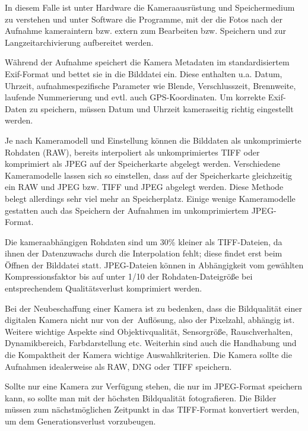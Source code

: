 In diesem Falle ist unter Hardware die Kameraausrüstung und Speichermedium zu verstehen und unter Software die Programme, mit der die Fotos nach der Aufnahme kameraintern bzw. extern zum Bearbeiten bzw. Speichern und zur Langzeitarchivierung aufbereitet werden.

Während der Aufnahme speichert die Kamera Metadaten im standardisiertem Exif-Format und bettet sie in die Bilddatei ein. Diese enthalten u.a. Datum, Uhrzeit, aufnahmespezifische Parameter wie Blende, Verschlusszeit, Brennweite, laufende Nummerierung und evtl. auch GPS-Koordinaten. Um korrekte Exif-Daten zu speichern, müssen Datum und Uhrzeit kameraseitig richtig eingestellt werden.

Je nach Kameramodell und Einstellung können die Bilddaten als unkomprimierte Rohdaten (RAW), bereits interpoliert als unkomprimiertes TIFF oder komprimiert als JPEG auf der Speicherkarte abgelegt werden. Verschiedene Kameramodelle lassen sich so einstellen, dass auf der Speicherkarte gleichzeitig ein RAW und JPEG bzw. TIFF und JPEG abgelegt werden. Diese Methode belegt allerdings sehr viel mehr an Speicherplatz. Einige wenige Kameramodelle gestatten auch das Speichern der Aufnahmen im unkomprimiertem JPEG-Format.

Die kameraabhängigen Rohdaten sind um 30\% kleiner als TIFF-Dateien, da ihnen der Datenzuwachs durch die Interpolation fehlt; diese findet erst beim Öffnen der Bilddatei statt. JPEG-Dateien können in Abhängigkeit vom gewählten Kompressionsfaktor bis auf unter 1/10 der Rohdaten-Dateigröße bei entsprechendem Qualitätsverlust komprimiert werden.

Bei der Neubeschaffung einer  Kamera ist zu bedenken, dass die Bildqualität einer digitalen Kamera nicht nur von der Auflösung, also der Pixelzahl, abhängig ist. Weitere wichtige Aspekte sind Objektivqualität, Sensorgröße, Rauschverhalten, Dynamikbereich, Farbdarstellung etc. Weiterhin sind auch die Handhabung und die Kompaktheit der Kamera wichtige Auswahlkriterien. Die Kamera sollte die Aufnahmen idealerweise als RAW, DNG oder TIFF speichern. 

Sollte nur eine Kamera zur Verfügung stehen, die nur im JPEG-Format speichern kann, so sollte man mit der höchsten Bildqualität fotografieren. Die Bilder müssen zum nächstmöglichen Zeitpunkt in das TIFF-Format konvertiert werden, um dem Generationsverlust vorzubeugen.

